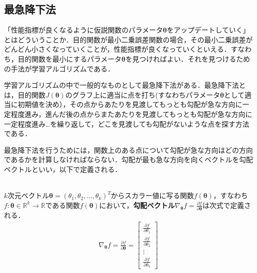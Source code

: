 \begin{cod}[参考：上記散布図作成(\texttt{lrfig1.py})]　
}]{code/lrfig1.py}
\end{cod}

\subsection{最急降下法}

「性能指標が良くなるように仮説関数のパラメータ${\bm \theta}$をアップデートしていく」とはどういうことか．目的関数が最小二乗誤差関数の場合，その最小二乗誤差がどんどん小さくなっていくことが，性能指標が良くなっていくといえる．すなわち，目的関数を最小にするパラメータ${\bm \theta}$を見つければよい．それを見つけるための手法が学習アルゴリズムである．

学習アルゴリズムの中で一般的なものとして最急降下法がある．最急降下法とは，目的関数$J({\bm \theta})$のグラフ上に適当に点を打ち(すなわちパラメータ${\bm \theta}$として適当に初期値を決め），その点からあたりを見渡してもっとも勾配が急な方向に一定程度進み，進んだ後の点からまたあたりを見渡してもっとも勾配が急な方向に一定程度進み\ldots を繰り返して，どこを見渡しても勾配がないような点を探す方法である．

最急降下法を行うためには，関数上のある点について勾配が急な方向はどの方向であるかを計算しなければならない．勾配が最も急な方向を向くベクトルを勾配ベクトルといい，以下で定義される．
\begin{defi}[勾配ベクトル]
　\\
$k$次元ベクトル${\bm \theta}=(\theta_1,\theta_2,\ldots,\theta_k)^T$からスカラー値に写る関数$f({\bm \theta})$，すなわち$f:{\bm \theta} \in \mathbb{R}^k \to \mathbb{R}$である関数$f({\bm \theta})$において，{\bf 勾配ベクトル}$\nabla_{{\bm \theta}}f=\frac{\partial f}{\partial {\bm \theta}}$は次式で定義される．
\begin{align}
\nabla_{{\bm \theta}}f = \frac{\partial f}{\partial {\bm \theta}} = 
\begin{bmatrix}
\frac{\partial f}{\partial \theta_1} \\[5pt]
\frac{\partial f}{\partial \theta_2} \\[3pt]
\vdots \\[5pt]
\frac{\partial f}{\partial \theta_k}
\end{bmatrix}
\end{align}
\end{defi}

